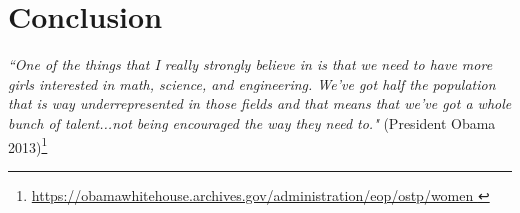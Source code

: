 \documentclass[11pt]{article}
\begin{document}




\section{Conclusion}






\textit{``One of the things that I really strongly believe in is that we need to have more girls interested in math, science, and engineering. We've got half the population that is way underrepresented in those fields and that means that we've got a whole bunch of talent...not being encouraged the way they need to."} (President Obama 2013)\footnote{\url{https://obamawhitehouse.archives.gov/administration/eop/ostp/women
}}
\end{document}
